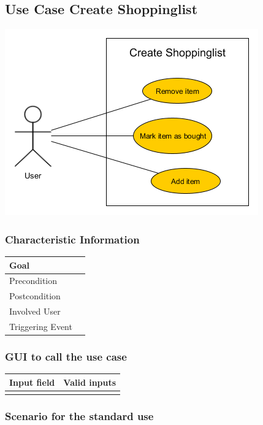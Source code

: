 \documentclass[12pt]{article}
\theoremstyle{definition}
\begin{document}
\subsection{Use Case Create Shoppinglist}

\includegraphics[scale=.5]{UseCaseCreateShoppinglist.png}\\


\subsubsection{Characteristic Information}

\begin{tabular}{|l|l|}
\hline
Goal &  \\ \hline
Precondition &  \\ \hline
Postcondition &  \\ \hline
Involved User &  \\ \hline
Triggering Event &  \\ \hline
\end{tabular}


\subsubsection{GUI to call the use case}

\begin{tabular}{|l|l|}
\hline
Input field & Valid inputs \\ \hline
 &  \\ \hline
\end{tabular}

\subsubsection{Scenario for the standard use}
\end{document}
